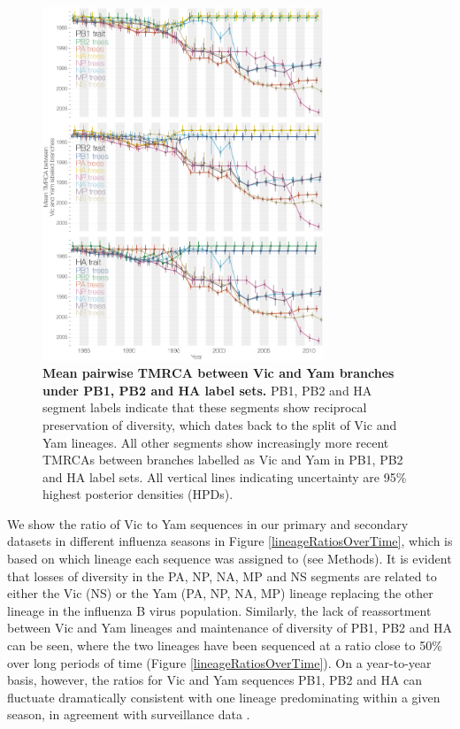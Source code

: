 \documentclass[11pt,oneside,letterpaper]{article}
\begin{document}
\begin{figure}[h]
	\centering		
	\includegraphics[width=0.75\textwidth]{figures/InfB_betweenDiversity.png}
	\caption{\textbf{Mean pairwise TMRCA between Vic and Yam branches under PB1, PB2 and HA label sets.}
PB1, PB2 and HA segment labels indicate that these segments show reciprocal preservation of diversity, which dates back to the split of Vic and Yam lineages.
All other segments show increasingly more recent TMRCAs between branches labelled as Vic and Yam in PB1, PB2 and HA label sets.
All vertical lines indicating uncertainty are 95\% highest posterior densities (HPDs).}
	\label{betweenDiversity}
\end{figure}

We show the ratio of Vic to Yam sequences in our primary and secondary datasets in different influenza seasons in Figure \ref{lineageRatiosOverTime}, which is based on which lineage each sequence was assigned to (see Methods).
It is evident that losses of diversity in the PA, NP, NA, MP and NS segments are related to either the Vic (NS) or the Yam (PA, NP, NA, MP) lineage replacing the other lineage in the influenza B virus population.
Similarly, the lack of reassortment between Vic and Yam lineages and maintenance of diversity of PB1, PB2 and HA can be seen, where the two lineages have been sequenced at a ratio close to 50\% over long periods of time (Figure \ref{lineageRatiosOverTime}).
On a year-to-year basis, however, the ratios for Vic and Yam sequences PB1, PB2 and HA can fluctuate dramatically consistent with one lineage predominating within a given season, in agreement with surveillance data \citep{reed2012}.
\end{document}
